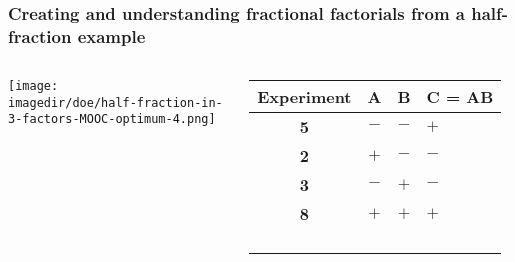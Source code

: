 \begin{frame}\frametitle{{\large Creating and understanding fractional factorials from a half-fraction example}}
	\begin{columns}
			\begin{center}
				\texttt{[image: \\imagedir/doe/half-fraction-in-3-factors-MOOC-optimum-4.png]}
			\end{center}

			\begin{tabulary}{\linewidth}{cccl}\hline 
				\textsf{\relax Experiment } & \textbf{\relax A } & \textbf{\relax B } & \textbf{\relax C = AB } \\
				\hline 
				 \color{myOrange} \textbf{5} & \(-\) & \(-\) & \(+\) \\
				 \color{myOrange} \textbf{2} & \(+\) & \(-\) & \(-\) \\
				 \color{myOrange} \textbf{3} & \(-\) & \(+\) & \(-\) \\
				 \color{myOrange} \textbf{8} & \(+\) & \(+\) & \(+\) \\ \hline
				  & & & \\
				  & & & \\
				  & & & \\
				  & & & 
			\end{tabulary}
	\end{columns}	
\end{frame}

